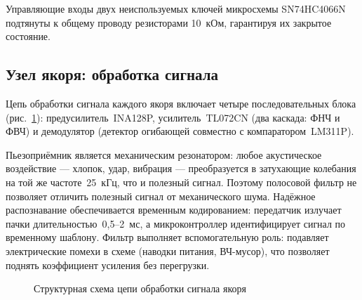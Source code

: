 \documentclass[a4paper,11pt]{article} %
\begin{document}
Управляющие входы двух неиспользуемых ключей микросхемы SN74HC4066N подтянуты к общему
проводу резисторами 10~кОм, гарантируя их закрытое состояние.

\FloatBarrier

\subsection{Узел якоря: обработка сигнала}

Цепь обработки сигнала каждого якоря включает четыре последовательных блока
(рис.~\ref{fig:anchor-block}): предусилитель~INA128P, усилитель~TL072CN
(два каскада: ФНЧ и ФВЧ) и демодулятор (детектор огибающей совместно с компаратором~LM311P).

Пьезоприёмник является механическим резонатором: любое акустическое воздействие ---
хлопок, удар, вибрация --- преобразуется в затухающие колебания на той же частоте~25~кГц,
что и полезный сигнал. Поэтому полосовой фильтр не позволяет отличить полезный сигнал
от механического шума. Надёжное распознавание обеспечивается временным кодированием:
передатчик излучает пачки длительностью~0{,}5--2~мс, а микроконтроллер идентифицирует
сигнал по временному шаблону. Фильтр выполняет вспомогательную роль: подавляет
электрические помехи в схеме (наводки питания, ВЧ-мусор), что позволяет поднять
коэффициент усиления без перегрузки.

\begin{figure}[h!]
\centering
{}
\caption{Структурная схема цепи обработки сигнала якоря}
\label{fig:anchor-block}
\end{figure}
\end{document}
